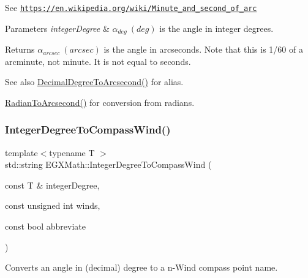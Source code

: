 See \href{https://en.wikipedia.org/wiki/Minute_and_second_of_arc}{\tt https\+://en.\+wikipedia.\+org/wiki/\+Minute\+\_\+and\+\_\+second\+\_\+of\+\_\+arc} 
\begin{DoxyParams}{Parameters}
{\em integer\+Degree} & $\alpha_{deg}\ (deg)$ is the angle in integer degrees. \\
\hline
\end{DoxyParams}
\begin{DoxyReturn}{Returns}
$\alpha_{arcsec}\ (arcsec)$ is the angle in arcseconds. Note that this is 1/60 of a arcminute, not minute. It is not equal to seconds. 
\end{DoxyReturn}
\begin{DoxySeeAlso}{See also}
\mbox{\hyperlink{group___e_g_x_math-_angle_conversions-_decimal_degree_gab9d5635a6e35127b5245978aba508962}{Decimal\+Degree\+To\+Arcsecond()}} for alias. 

\mbox{\hyperlink{group___e_g_x_math-_angle_conversions-_radian_ga2f952f6675a0fc54bf72bfe4e3d2664a}{Radian\+To\+Arcsecond()}} for conversion from radians. 
\end{DoxySeeAlso}
\mbox{\label{group___e_g_x_math-_angle_conversions-_integer_degree_ga01abeefd29282a3c88d3d3c28fd2c6fa}} 
\subsubsection{\texorpdfstring{Integer\+Degree\+To\+Compass\+Wind()}{IntegerDegreeToCompassWind()}}
{\footnotesize\ttfamily template$<$typename T $>$ \\
std\+::string E\+G\+X\+Math\+::\+Integer\+Degree\+To\+Compass\+Wind (\begin{DoxyParamCaption}\item[{const T \&}]{integer\+Degree,  }\item[{const unsigned int}]{winds,  }\item[{const bool}]{abbreviate }\end{DoxyParamCaption})}



Converts an angle in (decimal) degree to a n-\/\+Wind compass point name. 

